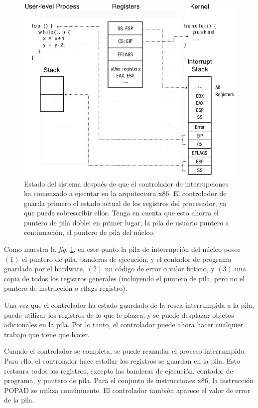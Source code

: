 \documentclass[10pt]{book}
\begin{document}
\begin{figure}[tbhp]
\centerline{\includegraphics[scale=0.55]{img/fig09}}
\caption{ Estado del sistema después de que el controlador de interrupciones ha comenzado a ejecutar en la arquitectura x86. El controlador de guarda primero el estado actual de los registros del procesador, ya que puede sobrescribir ellos. Tenga en cuenta que esto ahorra el puntero de pila doble: en primer lugar, la pila de usuario puntero a continuación, el puntero de pila del núcleo.}
\label{fig09}
\end{figure}

Como muestra la \textit{fig.} \ref{fig09}, en este punto la pila de interrupción del núcleo posee $(1)$ el puntero de pila, banderas de ejecución, y el contador de programa guardada por el hardware, $(2)$ un código de error o valor ficticio, y $(3)$ una copia de todos los registros generales (incluyendo el puntero de pila, pero no el puntero de instrucción o eflags registro).

Una vez que el controlador ha estado guardado de la rosca interrumpida a la pila, puede utilizar los registros de lo que le plazca, y se puede desplazar objetos adicionales en la pila. Por lo tanto, el controlador puede ahora hacer cualquier trabajo que tiene que hacer.

Cuando el controlador se completa, se puede reanudar el proceso interrumpido. Para ello, el controlador hace estallar los registros se guardan en la pila. Esto restaura todos los registros, excepto las banderas de ejecución, contador de programa, y puntero de pila. Para el conjunto de instrucciones x$86$, la instrucción POPAD se utiliza comúnmente. El controlador también aparece el valor de error de la pila.
\end{document}
